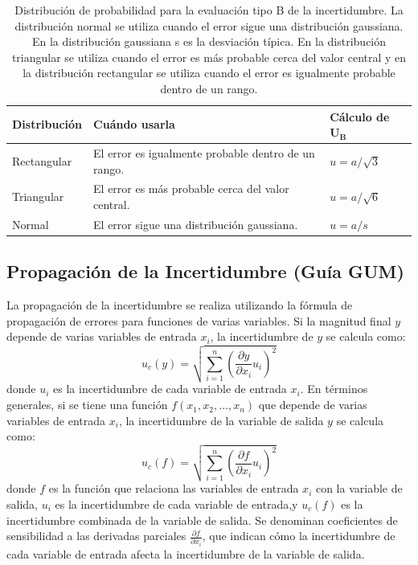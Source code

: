 \begin{table}[!htbp]
\centering
\caption[Distribuciones de probabilidad para la evaluación tipo B de la incertidumbre.]{Distribución de probabilidad para la evaluación tipo B de la incertidumbre. La distribución normal se utiliza cuando el error sigue una distribución gaussiana. En la distribución gaussiana s es la desviación típica. En la distribución triangular se utiliza cuando el error es más probable cerca del valor central y en la distribución rectangular se utiliza cuando el error es igualmente probable dentro de un rango.\protect\label{tab:distribuciones_tipoB}}
\forcerectofloat %
\setlength{\tabcolsep}{3pt} %
\begin{tabularx}{\linewidth}{M{2cm} X M{2cm}}    
\toprule
\textbf{Distribución} & \textbf{Cuándo usarla} & \textbf{Cálculo de $\mathbf{U_B}$} \\
\midrule
Rectangular & El error es igualmente probable dentro de un rango. & $u = a/\sqrt{3}$ \\
Triangular & El error es más probable cerca del valor central.  & $u = a/\sqrt{6}$ \\
Normal & El error sigue una distribución gaussiana. & $u = a/s$ \\
\bottomrule
\end{tabularx}

\end{table}


\subsection{Propagación de la Incertidumbre (Guía GUM)}\label{sec:propagacion}

La propagación de la incertidumbre se realiza utilizando la fórmula de propagación de errores para funciones de varias variables. Si la magnitud final $y$ depende de varias variables de entrada $x_i$, la incertidumbre de $y$ se calcula como:
    \[
    u_c(y) = \sqrt{\sum_{i=1}^{n} {\left( \frac{\partial y}{\partial x_i} u_i \right)}^2}
    \]
    donde $u_i$ es la incertidumbre de cada variable de entrada $x_i$. En términos generales, si se tiene una función $f(x_1, x_2, \ldots, x_n)$ que depende de varias variables de entrada $x_i$, la incertidumbre de la variable de salida $y$ se calcula como:
    \[
    u_c(f) = \sqrt{\sum_{i=1}^{n} {\left( \frac{\partial f}{\partial x_i} u_i \right)}^2}
    \]    
donde $f$ es la función que relaciona las variables de entrada $x_i$ con la variable de salida, $u_i$ es la incertidumbre de cada variable de entrada,y $u_c(f)$ es la incertidumbre combinada de la variable de salida. Se denominan coeficientes de sensibilidad a las derivadas parciales $\frac{\partial f}{\partial x_i}$, que indican cómo la incertidumbre de cada variable de entrada afecta la incertidumbre de la variable de salida.

